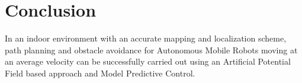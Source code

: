 \documentclass[a4paper, twocolumn]{article}
\begin{document}
\section{Conclusion}
In an indoor environment with an accurate mapping and localization scheme, 
path planning and obstacle avoidance for Autonomous Mobile Robots moving at an average velocity can be successfully carried out using 
an Artificial Potential Field based approach and Model Predictive Control.


 
\end{document}
